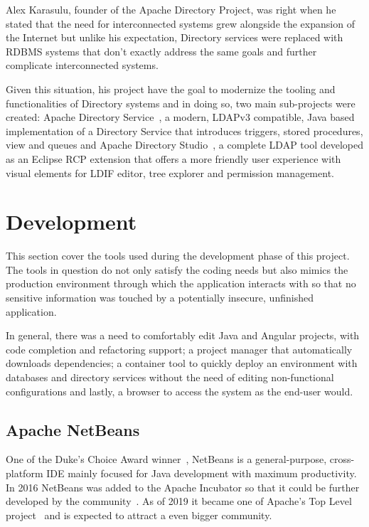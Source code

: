 Alex Karasulu, founder of the Apache Directory Project, was right when he stated that the need for interconnected systems grew alongside the expansion of the Internet but unlike his expectation, Directory services were replaced with \gls{RDBMS} systems that don't exactly address the same goals and further complicate interconnected systems\cite{apachedp}.

Given this situation, his project have the goal to modernize the tooling and functionalities of Directory systems and in doing so, two main sub-projects were created: Apache Directory Service~\cite{apachedservice}, a modern, \gls{LDAP}v3 compatible, Java based implementation of a Directory Service that introduces triggers, stored procedures, view and queues and Apache Directory Studio~\cite{apacheds}, a complete \gls{LDAP} tool developed as an Eclipse \gls{RCP} extension that offers a more friendly user experience with visual elements for  \gls{LDIF} editor, tree explorer and permission management.

\section{Development}\label{development}
This section cover the tools used during the development phase of this project. The tools in question do not only satisfy the coding needs but also mimics the production environment through which the application interacts with so that no sensitive information was touched by a potentially insecure, unfinished application.

In general, there was a need to comfortably edit Java and Angular projects, with code completion and refactoring support; a project manager that automatically downloads dependencies; a container tool to quickly deploy an environment with databases and directory services without the need of editing non-functional configurations and lastly, a browser to access the system as the end-user would.

\subsection{Apache NetBeans}\label{netbeans}
One of the Duke's Choice Award winner~\cite{dukechoice}, NetBeans is a general-purpose, cross-platform \gls{IDE} mainly focused for Java development with maximum productivity. In 2016 NetBeans was added to the Apache Incubator so that it could be further developed by the community~\cite{incubation}. As of 2019 it became one of Apache's Top Level project~\cite{graduation} and is expected to attract a even bigger community.

